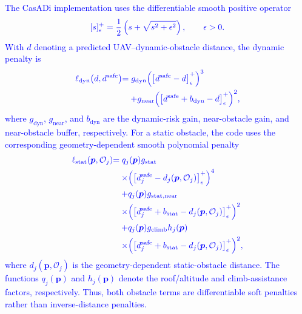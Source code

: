 \documentclass[lettersize,journal]{IEEEtran}
\newcommand{\vect}[1]{\boldsymbol{#1}}
\begin{document}
\textcolor{blue}{The CasADi implementation uses the differentiable smooth positive operator}
\begin{equation*}
	\textcolor{blue}{[s]_{\epsilon}^{+}=\frac{1}{2}\left(s+\sqrt{s^2+\epsilon^2}\right),\qquad \epsilon>0.}
\end{equation*}
\textcolor{blue}{With $d$ denoting a predicted UAV--dynamic-obstacle distance, the dynamic penalty is}
\begin{equation*}
	\begin{aligned}
		\textcolor{blue}{\ell_{\mathrm{dyn}}\!\left(d,d^{\mathrm{safe}}\right)} &\textcolor{blue}{=g_{\mathrm{dyn}}\Bigl(\left[d^{\mathrm{safe}}-d\right]_{\epsilon}^{+}\Bigr)^3} \\
		&\textcolor{blue}{\quad+g_{\mathrm{near}}\Bigl(\left[d^{\mathrm{safe}}+b_{\mathrm{dyn}}-d\right]_{\epsilon}^{+}\Bigr)^2,}
	\end{aligned}
\end{equation*}
\textcolor{blue}{where $g_{\mathrm{dyn}}$, $g_{\mathrm{near}}$, and $b_{\mathrm{dyn}}$ are the dynamic-risk gain, near-obstacle gain, and near-obstacle buffer, respectively. For a static obstacle, the code uses the corresponding geometry-dependent smooth polynomial penalty}
\begin{equation*}
	\begin{aligned}
		\textcolor{blue}{\ell_{\mathrm{stat}}\!\left(\vect{p},\mathcal{O}_j\right)} &\textcolor{blue}{=q_j(\vect{p})g_{\mathrm{stat}}} \\
		&\textcolor{blue}{\quad\times\Bigl(\left[d^{\mathrm{safe}}_j-d_j\!\left(\vect{p},\mathcal{O}_j\right)\right]_{\epsilon}^{+}\Bigr)^4} \\
		&\textcolor{blue}{\quad+q_j(\vect{p})g_{\mathrm{stat,near}}} \\
		&\textcolor{blue}{\quad\times\Bigl(\left[d^{\mathrm{safe}}_j+b_{\mathrm{stat}}-d_j\!\left(\vect{p},\mathcal{O}_j\right)\right]_{\epsilon}^{+}\Bigr)^2} \\
		&\textcolor{blue}{\quad+q_j(\vect{p})g_{\mathrm{climb}}h_j(\vect{p})} \\
		&\textcolor{blue}{\quad\times\Bigl(\left[d^{\mathrm{safe}}_j+b_{\mathrm{stat}}-d_j\!\left(\vect{p},\mathcal{O}_j\right)\right]_{\epsilon}^{+}\Bigr)^2,}
	\end{aligned}
\end{equation*}
\textcolor{blue}{where $d_j(\vect{p},\mathcal{O}_j)$ is the geometry-dependent static-obstacle distance. The functions $q_j(\vect{p})$ and $h_j(\vect{p})$ denote the roof/altitude and climb-assistance factors, respectively. Thus, both obstacle terms are differentiable soft penalties rather than inverse-distance penalties.}
\end{document}
